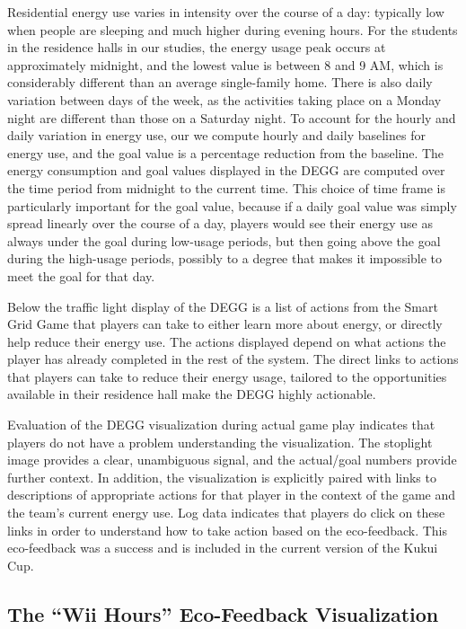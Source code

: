 \documentclass{sigchi}
\begin{document}
Residential energy use varies in intensity over the course of a day: typically low when people are sleeping and much higher during evening hours. For the students in the residence halls in our studies, the energy usage peak occurs at approximately midnight, and the lowest value is between 8 and 9 AM, which is considerably different than an average single-family home. There is also daily variation between days of the week, as the activities taking place on a Monday night are different than those on a Saturday night. To account for the hourly and daily variation in energy use, our we compute hourly and daily baselines for energy use, and the goal value is a percentage reduction from the baseline. The energy consumption and goal values displayed in the DEGG are computed over the time period from midnight to the current time. This choice of time frame is particularly important for the goal value, because if a daily goal value was simply spread linearly over the course of a day, players would see their energy use as always under the goal during low-usage periods, but then going above the goal during the high-usage periods, possibly to a degree that makes it impossible to meet the goal for that day.

Below the traffic light display of the DEGG is a list of actions from the Smart Grid Game that players can take to either learn more about energy, or directly help reduce their energy use. The actions displayed depend on what actions the player has already completed in the rest of the system. The direct links to actions that players can take to reduce their energy usage, tailored to the opportunities available in their residence hall make the DEGG highly actionable.

Evaluation of the DEGG visualization during actual game play indicates that players do not have a problem understanding the visualization. The stoplight image provides a clear, unambiguous signal, and the actual/goal numbers provide further context. In addition, the visualization is explicitly paired with links to descriptions of appropriate actions for that player in the context of the game and the team's current energy use. Log data indicates that players do click on these links in order to understand how to take action based on the eco-feedback. This eco-feedback was a success and is included in the current version of the Kukui Cup.


\subsection{The ``Wii Hours'' Eco-Feedback Visualization}
\end{document}
